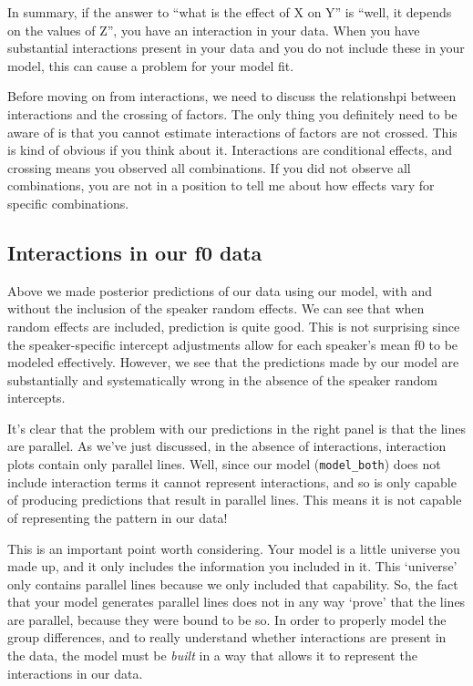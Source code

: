 \documentclass[
]{book}
\begin{document}
In summary, if the answer to ``what is the effect of X on Y'' is ``well, it depends on the values of Z'', you have an interaction in your data. When you have substantial interactions present in your data and you do not include these in your model, this can cause a problem for your model fit.

Before moving on from interactions, we need to discuss the relationshpi between interactions and the crossing of factors. The only thing you definitely need to be aware of is that you cannot estimate interactions of factors are not crossed. This is kind of obvious if you think about it. Interactions are conditional effects, and crossing means you observed all combinations. If you did not observe all combinations, you are not in a position to tell me about how effects vary for specific combinations.

\hypertarget{interactions-in-our-f0-data}{%
\subsection{Interactions in our f0 data}\label{interactions-in-our-f0-data}}

Above we made posterior predictions of our data using our model, with and without the inclusion of the speaker random effects. We can see that when random effects are included, prediction is quite good. This is not surprising since the speaker-specific intercept adjustments allow for each speaker's mean f0 to be modeled effectively. However, we see that the predictions made by our model are substantially and systematically wrong in the absence of the speaker random intercepts.

It's clear that the problem with our predictions in the right panel is that the lines are parallel. As we've just discussed, in the absence of interactions, interaction plots contain only parallel lines. Well, since our model (\texttt{model\_both}) does not include interaction terms it cannot represent interactions, and so is only capable of producing predictions that result in parallel lines. This means it is not capable of representing the pattern in our data!

This is an important point worth considering. Your model is a little universe you made up, and it only includes the information you included in it. This `universe' only contains parallel lines because we only included that capability. So, the fact that your model generates parallel lines does not in any way `prove' that the lines are parallel, because they were bound to be so. In order to properly model the group differences, and to really understand whether interactions are present in the data, the model must be \emph{built} in a way that allows it to represent the interactions in our data.
\end{document}
